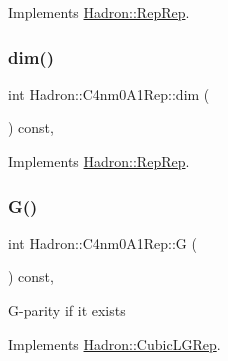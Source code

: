 Implements \mbox{\hyperlink{structHadron_1_1RepRep_a92c8802e5ed7afd7da43ccfd5b7cd92b}{Hadron\+::\+Rep\+Rep}}.

\mbox{\label{structHadron_1_1C4nm0A1Rep_a722d577aa4fe522bb25d0b7577e5dfbb}} 
\subsubsection{\texorpdfstring{dim()}{dim()}\hspace{0.1cm}{\footnotesize\ttfamily [3/3]}}
{\footnotesize\ttfamily int Hadron\+::\+C4nm0\+A1\+Rep\+::dim (\begin{DoxyParamCaption}{ }\end{DoxyParamCaption}) const\hspace{0.3cm}{\ttfamily [inline]}, {\ttfamily [virtual]}}



Implements \mbox{\hyperlink{structHadron_1_1RepRep_a92c8802e5ed7afd7da43ccfd5b7cd92b}{Hadron\+::\+Rep\+Rep}}.

\mbox{\label{structHadron_1_1C4nm0A1Rep_a4f044ae7849e3f42a9f5aa36150bcd80}} 
\subsubsection{\texorpdfstring{G()}{G()}\hspace{0.1cm}{\footnotesize\ttfamily [1/2]}}
{\footnotesize\ttfamily int Hadron\+::\+C4nm0\+A1\+Rep\+::G (\begin{DoxyParamCaption}{ }\end{DoxyParamCaption}) const\hspace{0.3cm}{\ttfamily [inline]}, {\ttfamily [virtual]}}

G-\/parity if it exists 

Implements \mbox{\hyperlink{structHadron_1_1CubicLGRep_ace26f7b2d55e3a668a14cb9026da5231}{Hadron\+::\+Cubic\+L\+G\+Rep}}.

\mbox{\label{structHadron_1_1C4nm0A1Rep_a4f044ae7849e3f42a9f5aa36150bcd80}} 

